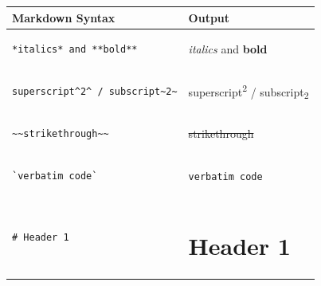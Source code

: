 \documentclass[
  letterpaper,
  DIV=11,
  numbers=noendperiod,
  oneside]{scrreprt}
\newcounter{none} %
\begin{document}
\begin{tcolorbox}
{\def\LTcaptype{none} %
\begin{longtable}[]{@{}
  >{\raggedright\arraybackslash}p{}
  >{\raggedright\arraybackslash}p{}@{}}
\toprule\noalign{}
\begin{minipage}[b]{\linewidth}\raggedright
Markdown Syntax
\end{minipage} & \begin{minipage}[b]{\linewidth}\raggedright
Output
\end{minipage} \\
\midrule\noalign{}
\endhead
\bottomrule\noalign{}
\endlastfoot
\begin{minipage}[t]{\linewidth}\raggedright
\begin{verbatim}
*italics* and **bold**
\end{verbatim}
\end{minipage} & \emph{italics} and \textbf{bold} \\
\begin{minipage}[t]{\linewidth}\raggedright
\begin{verbatim}
superscript^2^ / subscript~2~
\end{verbatim}
\end{minipage} & superscript\textsuperscript{2} /
subscript\textsubscript{2} \\
\begin{minipage}[t]{\linewidth}\raggedright
\begin{verbatim}
~~strikethrough~~
\end{verbatim}
\end{minipage} & \st{strikethrough} \\
\begin{minipage}[t]{\linewidth}\raggedright
\begin{verbatim}
`verbatim code`
\end{verbatim}
\end{minipage} & \texttt{verbatim\ code} \\
\begin{minipage}[t]{\linewidth}\raggedright
\begin{verbatim}
# Header 1
\end{verbatim}
\end{minipage} & \begin{minipage}[t]{\linewidth}\raggedright
\chapter*{Header 1}\label{header-1}
\addcontentsline{toc}{chapter}{Header 1}


\end{minipage}
\end{longtable}}
\end{tcolorbox}
\end{document}
